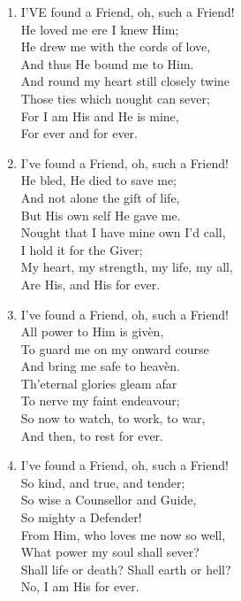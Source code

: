 \documentclass[11pt,a4paper]{article}
\begin{document}
\begin{enumerate}
    \item I'VE found a Friend, oh, such a Friend! \\
            He loved me ere I knew Him; \\
        He drew me with the cords of love, \\
            And thus He bound me to Him. \\
        And round my heart still closely twine \\
            Those ties which nought can sever; \\
        For I am His and He is mine, \\
            For ever and for ever.

    \item I've found a Friend, oh, such a Friend! \\
            He bled, He died to save me; \\
        And not alone the gift of life, \\
            But His own self He gave me. \\
        Nought that I have mine own I'd call, \\
            I hold it for the Giver; \\
        My heart, my strength, my life, my all, \\
            Are His, and His for ever.

    \item I've found a Friend, oh, such a Friend! \\
            All power to Him is giv\`en, \\
        To guard me on my onward course \\
            And bring me safe to heav\`en. \\
        Th'eternal glories gleam afar \\
            To nerve my faint endeavour; \\
        So now to watch, to work, to war, \\
            And then, to rest for ever.

    \item I've found a Friend, oh, such a Friend! \\
            So kind, and true, and tender; \\
        So wise a Counsellor and Guide, \\
            So mighty a Defender! \\
        From Him, who loves me now so well, \\
            What power my soul shall sever? \\
        Shall life or death? Shall earth or hell? \\
            No, I am His for ever.

\end{enumerate}
\end{document}
